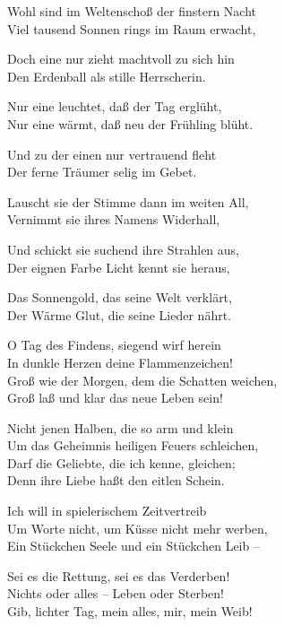 \begin{liebesgedicht}
Wohl sind im Weltenschoß der finstern Nacht\\
Viel tausend Sonnen rings im Raum erwacht,

Doch eine nur zieht machtvoll zu sich hin\\
Den Erdenball als stille Herrscherin.

Nur eine leuchtet, daß der Tag erglüht,\\ Nur eine wärmt, daß neu
der Frühling blüht.

Und zu der einen nur vertrauend fleht\\ Der ferne Träumer selig im
Gebet.

Lauscht sie der Stimme dann im weiten All,\\ Vernimmt sie ihres
Namens Widerhall,

Und schickt sie suchend ihre Strahlen aus,\\ Der eignen Farbe Licht
kennt sie heraus,

Das Sonnengold, das seine Welt verklärt,\\ Der Wärme Glut, die
seine Lieder nährt.
\end{liebesgedicht}

\begin{liebesgedicht}
O Tag des Findens, siegend wirf herein\\
In dunkle Herzen deine Flammenzeichen!\\
Groß wie der Morgen, dem die Schatten weichen,\\
Groß laß und klar das neue Leben sein!

Nicht jenen Halben, die so arm und klein\\
Um das Geheimnis heiligen Feuers schleichen,\\
Darf die Geliebte, die ich kenne, gleichen;\\
Denn ihre Liebe haßt den eitlen Schein.

Ich will in spielerischem Zeitvertreib\\
Um Worte nicht, um Küsse nicht mehr werben,\\
Ein Stückchen Seele und ein Stückchen Leib –

Sei es die Rettung, sei es das Verderben!\\
Nichts oder alles – Leben oder Sterben!\\
Gib, lichter Tag, mein alles, mir, mein Weib!
\end{liebesgedicht}

\smallskip

